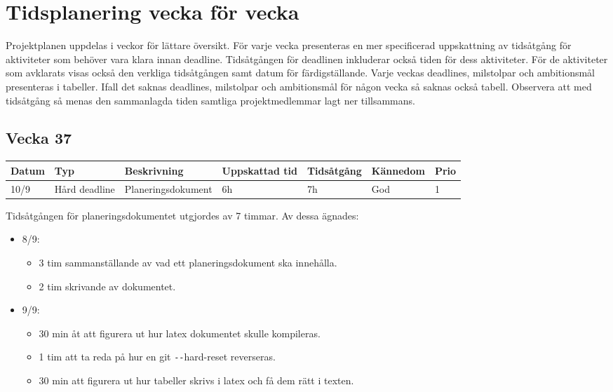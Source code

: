 \documentclass{TDP003mall}
\begin{document}
\section{Tidsplanering vecka för vecka}
Projektplanen uppdelas i veckor för lättare översikt. För varje vecka presenteras
 en mer specificerad uppskattning av tidsåtgång för aktiviteter som behöver vara
 klara innan deadline. Tidsåtgången för deadlinen inkluderar också tiden för dess
 aktiviteter. För de aktiviteter som avklarats visas också den verkliga tidsåtgången
 samt datum för färdigställande. Varje veckas deadlines, milstolpar och ambitionsmål presenteras
 i tabeller. Ifall det saknas deadlines, milstolpar och ambitionsmål för någon vecka så saknas också tabell. Observera att med tidsåtgång så menas den sammanlagda tiden samtliga projektmedlemmar lagt ner tillsammans.

\subsection{Vecka 37}
\begin{tabularx}{\linewidth}{|l|l|X|l|l|l|l|}
	\hline
	Datum & Typ           & Beskrivning        & Uppskattad tid & Tidsåtgång & Kännedom & Prio \\ [0.5ex]
	\hline                                             
	10/9  & Hård deadline & Planeringsdokument & 6h             & 7h         & God      & 1    \\
	\hline
\end{tabularx}

Tidsåtgången för planeringsdokumentet utgjordes av 7 timmar. Av dessa ägnades:
\begin{itemize}
	\item 8/9:
	\begin{itemize}
		\item 3 tim sammanställande av vad ett planeringsdokument ska innehålla.
		\item 2 tim skrivande av dokumentet.
	\end{itemize}
	\item 9/9:
	\begin{itemize}
		\item 30 min åt att figurera ut hur latex dokumentet skulle kompileras.
		\item 1 tim att ta reda på hur en git \texttt{-{}-}hard-reset reverseras.
		\item 30 min att figurera ut hur tabeller skrivs i latex och få dem rätt i texten.\\
	\end{itemize}
\end{itemize}
\end{document}
